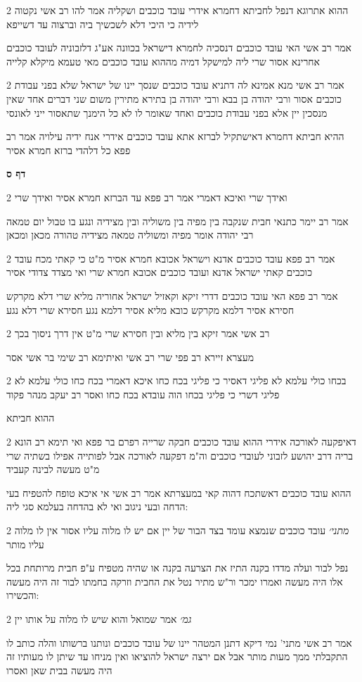 \documentclass[12pt, openany]{book}
\newcommand{\sethebfont}{
\fontsize{10.5pt}{21.0pt} \selectfont
}
\newcommand{\twocol}[1]{
	{\sethebfont \begin{multicols}{2}
			#1
	\end{multicols}}	
}
\newcommand{\sectname}{}
\newcommand{\newsection}[1]{
	\addcontentsline{toc}{section}{#1}
	\renewcommand{\sectname}{#1}	
	\vspace{-\baselineskip}
	\begin{center}
		\textbf{%
\fontsize{16pt}{16pt}\selectfont
			#1}
	\end{center}
	\vspace{-\baselineskip}
	\nopagebreak
}
\begin{document}
\twocol{ההוא אתרוגא דנפל לחביתא דחמרא אידרי עובד כוכבים ושקליה אמר להו רב אשי נקטוה לידיה כי היכי דלא לשכשיך ביה וברצוה עד דשייפא
\par אמר רב אשי האי עובד כוכבים דנסכיה לחמרא דישראל בכוונה אע"ג דלזבוניה לעובד כוכבים אחרינא אסור שרי ליה למישקל דמיה מההוא עובד כוכבים מאי טעמא מיקלא קלייה}
\twocol{אמר רב אשי מנא אמינא לה דתניא עובד כוכבים שנסך יינו של ישראל שלא בפני עבודת כוכבים אסור ורבי יהודה בן בבא ורבי יהודה בן בתירא מתירין משום שני דברים אחד שאין מנסכין יין אלא בפני עבודת כוכבים ואחד שאומר לו לא כל הימנך שתאסור ייני לאונסי
\par ההיא חביתא דחמרא דאישתקיל לברזא אתא עובד כוכבים אידרי אנח ידיה עילויה אמר רב פפא כל דלהדי ברזא חמרא אסיר}
\newsection{דף ס}
\twocol{ואידך שרי ואיכא דאמרי אמר רב פפא עד הברזא חמרא אסיר ואידך שרי
\par אמר רב יימר כתנאי חבית שנקבה בין מפיה בין משוליה ובין מצידיה ונגע בו טבול יום טמאה רבי יהודה אומר מפיה ומשוליה טמאה מצידיה טהורה מכאן ומכאן}
\twocol{אמר רב פפא עובד כוכבים אדנא וישראל אכובא חמרא אסיר מ"ט כי קאתי מכח עובד כוכבים קאתי ישראל אדנא ועובד כוכבים אכובא חמרא שרי ואי מצדד צדודי אסיר
\par אמר רב פפא האי עובד כוכבים דדרי זיקא וקאזיל ישראל אחוריה מליא שרי דלא מקרקש חסירא אסיר דלמא מקרקש כובא מליא אסיר דלמא נגע חסירא שרי דלא נגע}
\twocol{רב אשי אמר זיקא בין מליא ובין חסירא שרי מ"ט אין דרך ניסוך בכך
\par מעצרא זיירא רב פפי שרי רב אשי ואיתימא רב שימי בר אשי אסר}
\twocol{בכחו כולי עלמא לא פליגי דאסיר כי פליגי בכח כחו איכא דאמרי בכח כחו כולי עלמא לא פליגי דשרי כי פליגי בכחו הוה עובדא בכח כחו ואסר רב יעקב מנהר פקוד
\par ההוא חביתא}
\twocol{דאיפקעה לאורכה אידרי ההוא עובד כוכבים חבקה שרייה רפרם בר פפא ואי תימא רב הונא בריה דרב יהושע לזבוני לעובדי כוכבים וה"מ דפקעה לאורכה אבל לפותייה אפילו בשתיה שרי מ"ט מעשה לבינה קעביד
\par ההוא עובד כוכבים דאשתכח דהוה קאי במעצרתא אמר רב אשי אי איכא טופח להטפיח בעי הדחה ובעי ניגוב ואי לא בהדחה בעלמא סגי ליה:}
\twocol{{\large\emph{מתני׳}} עובד כוכבים שנמצא עומד בצד הבור של יין אם יש לו מלוה עליו אסור אין לו מלוה עליו מותר
\par נפל לבור ועלה מדדו בקנה התיז את הצרעה בקנה או שהיה מטפיח ע"פ חבית מרותחת בכל אלו היה מעשה ואמרו ימכר ור"ש מתיר נטל את החבית וזרקה בחמתו לבור זה היה מעשה והכשירו:}
\twocol{{\large\emph{גמ׳}} אמר שמואל והוא שיש לו מלוה על אותו יין
\par אמר רב אשי מתני' נמי דיקא דתנן המטהר יינו של עובד כוכבים ונותנו ברשותו והלה כותב לו התקבלתי ממך מעות מותר אבל אם ירצה ישראל להוציאו ואין מניחו עד שיתן לו מעותיו זה היה מעשה בבית שאן ואסרו}
\end{document}
